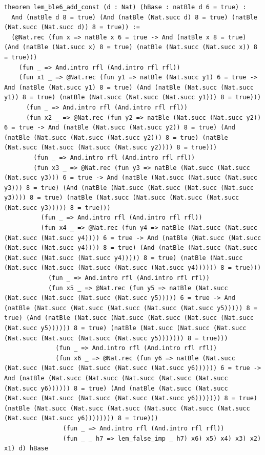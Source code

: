 \documentclass[11pt,letterpaper]{article}
\theoremstyle{spectralthm}
\begin{document}
\begin{lstlisting}[language=Lean4,caption={Standalone Pure Init.Prelude Term-Mode Lean 4 Kernel Suite (thm30--thm61, v0.0.0, 0 sorry, 0 axioms).},label={lst:lean_unified}]
theorem lem_ble6_add_const (d : Nat) (hBase : natBle d 6 = true) :
  And (natBle d 8 = true) (And (natBle (Nat.succ d) 8 = true) (natBle (Nat.succ (Nat.succ d)) 8 = true)) :=
  (@Nat.rec (fun x => natBle x 6 = true -> And (natBle x 8 = true) (And (natBle (Nat.succ x) 8 = true) (natBle (Nat.succ (Nat.succ x)) 8 = true)))
    (fun _ => And.intro rfl (And.intro rfl rfl))
    (fun x1 _ => @Nat.rec (fun y1 => natBle (Nat.succ y1) 6 = true -> And (natBle (Nat.succ y1) 8 = true) (And (natBle (Nat.succ (Nat.succ y1)) 8 = true) (natBle (Nat.succ (Nat.succ (Nat.succ y1))) 8 = true)))
      (fun _ => And.intro rfl (And.intro rfl rfl))
      (fun x2 _ => @Nat.rec (fun y2 => natBle (Nat.succ (Nat.succ y2)) 6 = true -> And (natBle (Nat.succ (Nat.succ y2)) 8 = true) (And (natBle (Nat.succ (Nat.succ (Nat.succ y2))) 8 = true) (natBle (Nat.succ (Nat.succ (Nat.succ (Nat.succ y2)))) 8 = true)))
        (fun _ => And.intro rfl (And.intro rfl rfl))
        (fun x3 _ => @Nat.rec (fun y3 => natBle (Nat.succ (Nat.succ (Nat.succ y3))) 6 = true -> And (natBle (Nat.succ (Nat.succ (Nat.succ y3))) 8 = true) (And (natBle (Nat.succ (Nat.succ (Nat.succ (Nat.succ y3)))) 8 = true) (natBle (Nat.succ (Nat.succ (Nat.succ (Nat.succ (Nat.succ y3))))) 8 = true)))
          (fun _ => And.intro rfl (And.intro rfl rfl))
          (fun x4 _ => @Nat.rec (fun y4 => natBle (Nat.succ (Nat.succ (Nat.succ (Nat.succ y4)))) 6 = true -> And (natBle (Nat.succ (Nat.succ (Nat.succ (Nat.succ y4)))) 8 = true) (And (natBle (Nat.succ (Nat.succ (Nat.succ (Nat.succ (Nat.succ y4))))) 8 = true) (natBle (Nat.succ (Nat.succ (Nat.succ (Nat.succ (Nat.succ (Nat.succ y4)))))) 8 = true)))
            (fun _ => And.intro rfl (And.intro rfl rfl))
            (fun x5 _ => @Nat.rec (fun y5 => natBle (Nat.succ (Nat.succ (Nat.succ (Nat.succ (Nat.succ y5))))) 6 = true -> And (natBle (Nat.succ (Nat.succ (Nat.succ (Nat.succ (Nat.succ y5))))) 8 = true) (And (natBle (Nat.succ (Nat.succ (Nat.succ (Nat.succ (Nat.succ (Nat.succ y5)))))) 8 = true) (natBle (Nat.succ (Nat.succ (Nat.succ (Nat.succ (Nat.succ (Nat.succ (Nat.succ y5))))))) 8 = true)))
              (fun _ => And.intro rfl (And.intro rfl rfl))
              (fun x6 _ => @Nat.rec (fun y6 => natBle (Nat.succ (Nat.succ (Nat.succ (Nat.succ (Nat.succ (Nat.succ y6)))))) 6 = true -> And (natBle (Nat.succ (Nat.succ (Nat.succ (Nat.succ (Nat.succ (Nat.succ y6)))))) 8 = true) (And (natBle (Nat.succ (Nat.succ (Nat.succ (Nat.succ (Nat.succ (Nat.succ (Nat.succ y6))))))) 8 = true) (natBle (Nat.succ (Nat.succ (Nat.succ (Nat.succ (Nat.succ (Nat.succ (Nat.succ (Nat.succ y6)))))))) 8 = true)))
                (fun _ => And.intro rfl (And.intro rfl rfl))
                (fun _ _ h7 => lem_false_imp _ h7) x6) x5) x4) x3) x2) x1) d) hBase


\end{lstlisting}
\end{document}
